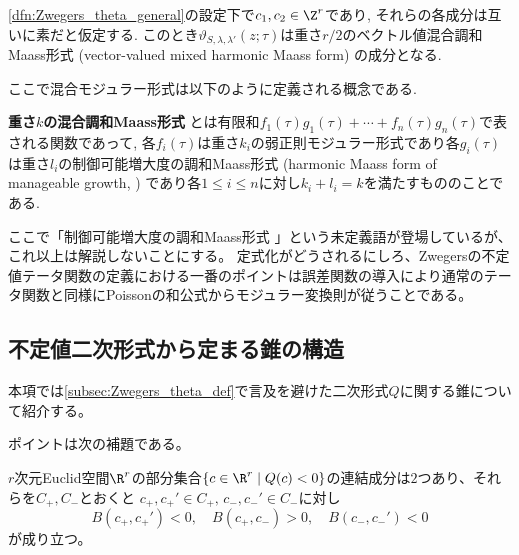 \documentclass[11pt,b5paper,oneside,lualatex]{ltjsarticle} %
\numberwithin{equation}{section} %
\begin{document}
\begin{thm}
	\cref{dfn:Zwegers_theta_general}の設定下で$ c_1, c_2 \in \Z^r $であり, それらの各成分は互いに素だと仮定する. 
	このとき$ \vartheta_{S, \lambda, \lambda'} \left( z; \tau \right) $は重さ$ r/2 $のベクトル値混合調和Maass形式 (vector-valued mixed harmonic Maass form) の成分となる. 
\end{thm}

ここで混合モジュラー形式は以下のように定義される概念である. 

\begin{dfn}
	\textbf{重さ$ k $の混合調和Maass形式}%
	とは有限和$ f_1(\tau) g_1(\tau) + \cdots + f_n(\tau) g_n(\tau) $で表される関数であって, 各$ f_i(\tau) $は重さ$ k_i $の弱正則モジュラー形式であり各$ g_i(\tau) $は重さ$ l_i $の制御可能増大度の調和Maass形式 (harmonic Maass form of manageable growth, \cite[Definition 4.1]{BFOR}) であり各$ 1 \le i \le n $に対し$ k_i + l_i = k $を満たすもののことである. 
\end{dfn}

ここで「制御可能増大度の調和Maass形式 」という未定義語が登場しているが、これ以上は解説しないことにする。
定式化がどうされるにしろ、Zwegersの不定値テータ関数の定義における一番のポイントは誤差関数の導入により通常のテータ関数と同様にPoissonの和公式からモジュラー変換則が従うことである。



\subsection{不定値二次形式から定まる錐の構造} \label{subsec:cone}


本項では\cref{subsec:Zwegers_theta_def}で言及を避けた二次形式$ Q $に関する錐について紹介する。

ポイントは次の補題である。

\begin{lem} \label{lem:cone}
	$ r $次元Euclid空間$ \R^r $の部分集合$ \{ c \in \R^r \mid Q(c) < 0 \} $の連結成分は$ 2 $つあり、それらを$ C_+, C_- $とおくと
	$ c_+, c_+' \in C_+, \, c_-, c_-' \in C_- $に対し
	\[
	B(c_+, c_+') < 0, \quad
	B(c_+, c_-) > 0, \quad
	B(c_-, c_-') < 0
	\]
	が成り立つ。
\end{lem}
\end{document}
